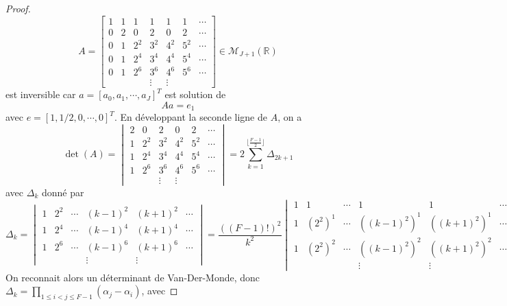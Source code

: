 \begin{proof}
\begin{equation}
A=\begin{bmatrix}
1 &  1  &  1  &  1  &  1  &  1  & \cdots\\  
0 &  2  &  0  &  2  &  0  & 2  & \cdots\\
0 &  1  & 2^2 & 3^2 & 4^2 & 5^2 & \cdots\\
0 &  1  & 2^4 & 3^4 & 4^4 & 5^4 & \cdots\\
0 &  1  & 2^6 & 3^6 & 4^6 & 5^6 & \cdots\\
&&& \vdots &  \vdots &
\end{bmatrix} \in \mathcal{M}_{J+1} \left( \mathbb{R} \right)
\end{equation}
est inversible car $a = [a_0, a_1, \cdots, a_J]^T$ est solution de 
\begin{equation}
A a = e_1
\end{equation}
avec $e = [1,1/2, 0,\cdots,0]^T$. En développant la seconde ligne de $A$, on a
\begin{equation}
\det ( A ) = \begin{vmatrix} 
2  &  0  &  2  &  0  & 2  & \cdots\\
1  & 2^2 & 3^2 & 4^2 & 5^2 & \cdots\\
1  & 2^4 & 3^4 & 4^4 & 5^4 & \cdots\\
1  & 2^6 & 3^6 & 4^6 & 5^6 & \cdots\\
& & \vdots &  \vdots &
\end{vmatrix} = 2 \sum_{k=1}^{\lfloor\frac{F-1}{2}\rfloor} \Delta_{2k+1}
\end{equation}
avec $\Delta_k$ donné par
\begin{equation}
\Delta_k = \begin{vmatrix} 
1 & 2^2 & \cdots & (k-1)^2 & (k+1)^2 & \cdots\\
1 & 2^4 & \cdots & (k-1)^4 & (k+1)^4 & \cdots\\
1 & 2^6 & \cdots & (k-1)^6 & (k+1)^6 & \cdots\\
&&& \vdots &  \vdots &
\end{vmatrix} = \dfrac{((F-1)!)^2}{k^2} \begin{vmatrix} 
1 & 1 & \cdots & 1 & 1 & \cdots\\
1 & (2^2)^1 & \cdots & ((k-1)^2)^1 & ((k+1)^2)^1 & \cdots\\
1 & (2^2)^2 & \cdots & ((k-1)^2)^2 & ((k+1)^2)^2 & \cdots\\
&&& \vdots &  \vdots &
\end{vmatrix}
\end{equation}
On reconnait alors un déterminant de Van-Der-Monde, donc $\Delta_k = \prod_{1 \leq i < j \leq F-1} \left( \alpha_j - \alpha_i \right)$, avec 

\end{proof}

